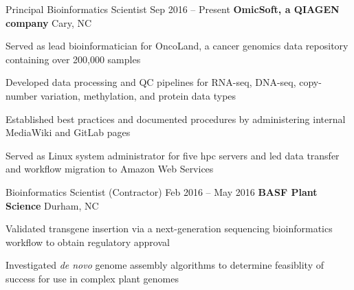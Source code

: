 
\begin{resentries}

  \resentry
    {Principal Bioinformatics Scientist}
    {Sep 2016 -- Present}
    {\textbf{OmicSoft, a QIAGEN company}} %
    {Cary, NC} %
    {
      \begin{cvitems} %
        \item{Served as lead bioinformatician for OncoLand, a cancer genomics data repository containing over 200,000 samples}
        \item{Developed data processing and QC pipelines for RNA-seq, DNA-seq, copy-number variation, methylation, and protein data types} 
        \item{Established best practices and documented procedures by administering internal MediaWiki and GitLab pages}
        \item{Served as Linux system administrator for five hpc servers and led data transfer and workflow migration to Amazon Web Services}
      \end{cvitems}
    }

  \resentry
    {Bioinformatics Scientist (Contractor)}
    {Feb 2016 -- May 2016}
    {\textbf{BASF Plant Science}}
    {Durham, NC}
    {
      \begin{cvitems} %
        \item{Validated transgene insertion via a next-generation sequencing bioinformatics workflow to obtain regulatory approval}
        \item{Investigated \textit{de novo} genome assembly algorithms to determine feasiblity of success for use in complex plant genomes}
      \end{cvitems}
    }

\end{resentries}
\vspace{-2mm}
